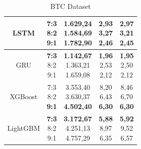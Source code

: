 \documentclass{ieeeojies}
\begin{document}
\begin{table}[H]
\begin{tabular*}{\linewidth}{@{\extracolsep{\fill}}|c|c|c|c|c|}
        \hline
        LSTM & \makecell{7:3 \\ 8:2 \\ \textbf{9:1}} & \makecell{1.629,24 \\ 1.584,69 \\ \textbf{1.782,90}} & \makecell{2,93 \\ 3,27 \\ \textbf{2,46}} & \makecell{2,97 \\ 3,21 \\ \textbf{2,45}} \\
        \hline
        GRU & \makecell{\textbf{7:3} \\ 8:2 \\ 9:1} & \makecell{\textbf{1.142,67} \\ 1.363,21 \\ 1.659,08} & \makecell{\textbf{1,96} \\ 2,53 \\ 2,12} & \makecell{\textbf{1,95} \\ 2,50 \\ 2,12} \\
        \hline
        XGBoost & \makecell{7:3 \\ 8:2 \\ \textbf{9:1}} & \makecell{3.553,40 \\ 3.630,37 \\ \textbf{4.502,40}} & \makecell{8,20 \\ 6,43 \\ \textbf{6,30}} & \makecell{8,46 \\ 6,70 \\ \textbf{6,30}} \\
        \hline
        LightGBM & \makecell{\textbf{7:3} \\ 8:2 \\ 9:1} & \makecell{\textbf{3.172,67} \\ 4.251,13 \\ 4.757,29} & \makecell{\textbf{5,88} \\ 8,97 \\ 6,35} & \makecell{\textbf{5,92} \\ 9,52 \\ 6,57} \\
        \hline
    \end{tabular*}
    \caption{BTC Dataset}
    \label{table:2}
\end{table}
\end{document}
